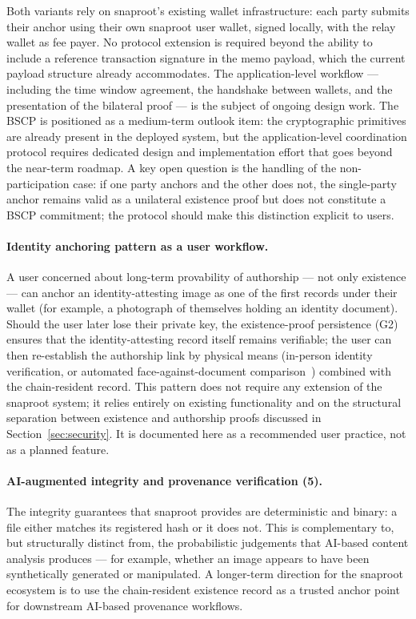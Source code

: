 \documentclass[11pt,a4paper]{article}
\begin{document}
Both variants rely on snaproot's existing wallet infrastructure: each
party submits their anchor using their own snaproot user wallet, signed
locally, with the relay wallet as fee payer. No protocol extension is
required beyond the ability to include a reference transaction
signature in the memo payload, which the current payload structure
already accommodates. The application-level workflow --- including
the time window agreement, the handshake between wallets, and the
presentation of the bilateral proof --- is the subject of ongoing
design work. The BSCP is positioned as a medium-term outlook item:
the cryptographic primitives are already present in the deployed
system, but the application-level coordination protocol requires
dedicated design and implementation effort that goes beyond the
near-term roadmap. A key open question is the handling of the
non-participation case: if one party anchors and the other does not,
the single-party anchor remains valid as a unilateral existence proof
but does not constitute a BSCP commitment; the protocol should
make this distinction explicit to users.

\paragraph{Identity anchoring pattern as a user workflow.} A user
concerned about long-term provability of authorship --- not only
existence --- can anchor an identity-attesting image as one of the
first records under their wallet (for example, a photograph of
themselves holding an identity document). Should the user later lose
their private key, the existence-proof persistence (G2) ensures that
the identity-attesting record itself remains verifiable; the user can
then re-establish the authorship link by physical means (in-person
identity verification, or automated face-against-document
comparison~\cite{spreeuwers2012biosig}) combined with the
chain-resident record. This pattern does not require any extension of
the snaproot system; it relies entirely on existing functionality and
on the structural separation between existence and authorship proofs
discussed in Section~\ref{sec:security}. It is documented here as a
recommended user practice, not as a planned feature.

\paragraph{AI-augmented integrity and provenance verification (5).}
\label{sec:limitations:ai}
The integrity guarantees that snaproot provides are deterministic and
binary: a file either matches its registered hash or it does not. This
is complementary to, but structurally distinct from, the probabilistic
judgements that AI-based content analysis produces --- for example,
whether an image appears to have been synthetically generated or
manipulated. A longer-term direction for the snaproot ecosystem is to
use the chain-resident existence record as a trusted anchor point for
downstream AI-based provenance workflows.
\end{document}
